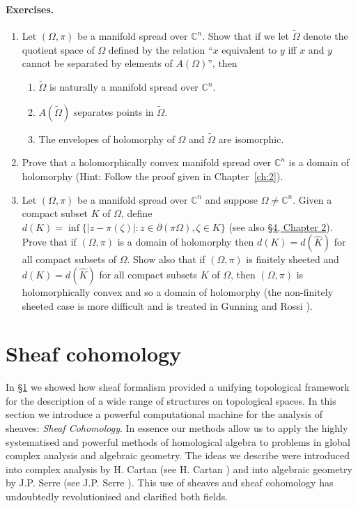 \paragraph{Exercises.}
\begin{enumerate}
\item Let $(\Omega,\pi)$ be a manifold spread over $\mathbb C^n$. Show that if we let $\widetilde\Omega$ denote the quotient space of $\Omega$ defined by the relation ``$x$ equivalent to $y$ iff $x$ and $y$ cannot be separated by elements of $A(\Omega)$'', then
\begin{enumerate}[label=\Alph*)]
\item $\widetilde\Omega$ is naturally a manifold spread over $\mathbb C^n$.
\item $A(\widetilde\Omega)$ separates points in $\widetilde\Omega$.
\item The envelopes of holomorphy of $\Omega$ and $\widetilde\Omega$ are isomorphic.
\end{enumerate}
\item Prove that a holomorphically convex manifold spread over $\mathbb C^n$ is a domain of holomorphy (Hint: Follow the proof given in Chapter~\ref{ch:2}).
\item Let $(\Omega,\pi)$ be a manifold spread over $\mathbb C^n$ and suppose $\Omega\neq\mathbb C^n$. Given a compact subset $K$ of $\Omega$, define $d(K)=\inf\{|z-\pi(\zeta)|:z\in\partial(\pi\Omega),\zeta\in K\}$ (see also \hyperref[sec:2:4]{\S4, Chapter 2}). Prove that if $(\Omega,\pi)$ is a domain of holomorphy then $d(K)=d(\widehat K)$ for all compact subsets of $\Omega$. Show also that if $(\Omega,\pi)$ is finitely sheeted and $d(K)=d(\widehat K)$ for all compact subsets $K$ of $\Omega$, then $(\Omega,\pi)$ is holomorphically convex and so a domain of holomorphy (the non-finitely sheeted case is more difficult and is treated in Gunning and Rossi \cite{bib:II:gunning-r-c-and-rossi-h:1}).
\end{enumerate}
\section{Sheaf cohomology}\label{sec:6:3}
In \hyperref[sec:6:1]{\S1} we showed how sheaf formalism provided a unifying topological framework for the description of a wide range of structures on topological spaces. In this section we introduce a powerful computational machine for the analysis of sheaves: \emph{Sheaf Cohomology}. In essence our methods allow us to apply the highly systematised and powerful methods of homological algebra to problems in global complex analysis and algebraic geometry. The ideas we describe were introduced into complex analysis by H. Cartan (see H. Cartan \cite{bib:II:cartan-h:1,bib:II:cartan-h:2}) and into algebraic geometry by J.P. Serre (see J.P. Serre \cite{bib:II:serre-j-p:2}). This use of sheaves and sheaf cohomology has undoubtedly revolutionised and clarified both fields.

